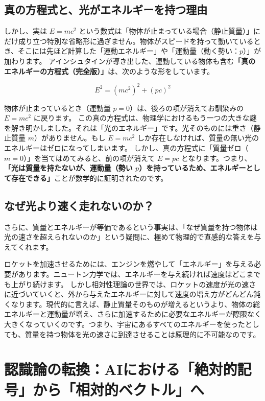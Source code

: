 \subsection{真の方程式と、光がエネルギーを持つ理由}

しかし、実は \ensuremath{E=mc^2} という数式は「物体が止まっている場合（静止質量）」にだけ成り立つ特別な省略形に過ぎません。物体がスピードを持って動いているとき、そこには先ほど計算した「運動エネルギー」や「運動量（動く勢い：\(p\)）」が加わります。 アインシュタインが導き出した、運動している物体も含む\textbf{「真のエネルギーの方程式（完全版）」}は、次のような形をしています。

\[
E^2=(mc^2)^2+(pc)^2
\]

物体が止まっているとき（運動量 \(p = 0\)）は、後ろの項が消えてお馴染みの \ensuremath{E=mc^2} に戻ります。 この真の方程式は、物理学におけるもう一つの大きな謎を解き明かしました。それは「光のエネルギー」です。光そのものには重さ（静止質量 \(m\)）がありません。もし \ensuremath{E=mc^2} しか存在しなければ、質量の無い光のエネルギーはゼロになってしまいます。 しかし、真の方程式に「質量ゼロ（\(m=0\)）」を当てはめてみると、前の項が消えて \(E = pc\) となります。つまり、\textbf{「光は質量を持たないが、運動量（勢い \(p\)）を持っているため、エネルギーとして存在できる」}ことが数学的に証明されたのです。

\subsection{なぜ光より速く走れないのか？}

さらに、質量とエネルギーが等価であるという事実は、「なぜ質量を持つ物体は光の速さを超えられないのか」という疑問に、極めて物理的で直感的な答えを与えてくれます。

ロケットを加速させるためには、エンジンを燃やして「エネルギー」を与える必要があります。ニュートン力学では、エネルギーを与え続ければ速度はどこまでも上がり続けます。 しかし相対性理論の世界では、ロケットの速度が光の速さに近づいていくと、外から与えたエネルギーに対して速度の増え方がどんどん鈍くなります。現代的に言えば、静止質量そのものが増えるというより、物体の総エネルギーと運動量が増え、さらに加速するために必要なエネルギーが際限なく大きくなっていくのです。つまり、宇宙にあるすべてのエネルギーを使ったとしても、質量を持つ物体を光の速さに到達させることは原理的に不可能なのです。

\section{認識論の転換：AIにおける「絶対的記号」から「相対的ベクトル」へ}

